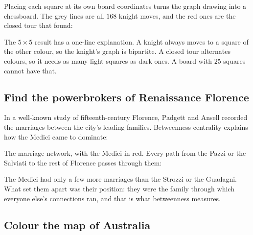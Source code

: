Placing each square at its own board coordinates turns the graph drawing into a
chessboard. The grey lines are all \(168\) knight moves, and the red ones are
the closed tour that  found:



The \(5 \times 5\) result has a one-line explanation. A knight always moves to a
square of the other colour, so the knight's graph is bipartite. A closed tour
alternates colours, so it needs as many light squares as dark ones. A board with
\(25\) squares cannot have that.

\subsection*{Find the powerbrokers of Renaissance Florence}

In a well-known study of fifteenth-century Florence, Padgett and Ansell recorded
the marriages between the city's leading families. Betweenness centrality
explains how the Medici came to dominate:

\begin{codepairs}
\end{codepairs}

The marriage network, with the Medici in red. Every path from the Pazzi or the
Salviati to the rest of Florence passes through them:



The Medici had only a few more marriages than the Strozzi or the Guadagni.
What set them apart was their position: they were the family through which
everyone else's connections ran, and that is what betweenness measures.

\subsection*{Colour the map of Australia}

